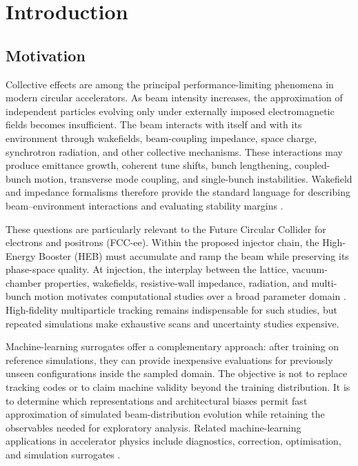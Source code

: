 \section{Introduction}
\label{sec:introduction}

\subsection{Motivation}

Collective effects are among the principal performance-limiting phenomena in modern circular accelerators. As beam intensity increases, the approximation of independent particles evolving only under externally imposed electromagnetic fields becomes insufficient. The beam interacts with itself and with its environment through wakefields, beam-coupling impedance, space charge, synchrotron radiation, and other collective mechanisms. These interactions may produce emittance growth, coherent tune shifts, bunch lengthening, coupled-bunch motion, transverse mode coupling, and single-bunch instabilities. Wakefield and impedance formalisms therefore provide the standard language for describing beam--environment interactions and evaluating stability margins \cite{metral_wake_2021}.

These questions are particularly relevant to the Future Circular Collider for electrons and positrons (FCC-ee). Within the proposed injector chain, the High-Energy Booster (HEB) must accumulate and ramp the beam while preserving its phase-space quality. At injection, the interplay between the lattice, vacuum-chamber properties, wakefields, resistive-wall impedance, radiation, and multi-bunch motion motivates computational studies over a broad parameter domain \cite{gibellieri_impact_fcc_heb}. High-fidelity multiparticle tracking remains indispensable for such studies, but repeated simulations make exhaustive scans and uncertainty studies expensive.

Machine-learning surrogates offer a complementary approach: after training on reference simulations, they can provide inexpensive evaluations for previously unseen configurations inside the sampled domain. The objective is not to replace tracking codes or to claim machine validity beyond the training distribution. It is to determine which representations and architectural biases permit fast approximation of simulated beam-distribution evolution while retaining the observables needed for exploratory analysis. Related machine-learning applications in accelerator physics include diagnostics, correction, optimisation, and simulation surrogates \cite{arpaia_machine_2021,roussel_bayesian_2024}.

